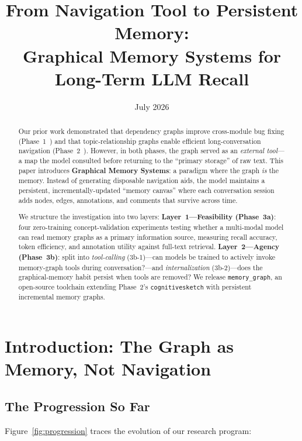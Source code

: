 \documentclass[11pt,a4paper]{article}
\title{\bfseries From Navigation Tool to Persistent Memory:\\[3pt]
       \large Graphical Memory Systems for Long-Term LLM Recall}
\author{}
\date{July 2026}
\begin{document}
\maketitle

\begin{abstract}
Our prior work demonstrated that dependency graphs improve cross-module bug fixing (Phase~1~\cite{depgraph2026}) and that topic-relationship graphs enable efficient long-conversation navigation (Phase~2~\cite{cognitivesketch2026}). However, in both phases, the graph served as an \textit{external tool}---a map the model consulted before returning to the ``primary storage'' of raw text. This paper introduces \textbf{Graphical Memory Systems}: a paradigm where the graph \textit{is} the memory. Instead of generating disposable navigation aids, the model maintains a persistent, incrementally-updated ``memory canvas'' where each conversation session adds nodes, edges, annotations, and comments that survive across time.

We structure the investigation into two layers: \textbf{Layer~1---Feasibility (Phase~3a)}: four zero-training concept-validation experiments testing whether a multi-modal model can read memory graphs as a primary information source, measuring recall accuracy, token efficiency, and annotation utility against full-text retrieval. \textbf{Layer~2---Agency (Phase~3b)}: split into \textit{tool-calling} (3b-1)---can models be trained to actively invoke memory-graph tools during conversation?---and \textit{internalization} (3b-2)---does the graphical-memory habit persist when tools are removed? We release \texttt{memory\_graph}, an open-source toolchain extending Phase~2's \texttt{cognitivesketch} with persistent incremental memory graphs.
\end{abstract}


\section{Introduction: The Graph as Memory, Not Navigation}

\subsection{The Progression So Far}

Figure~\ref{fig:progression} traces the evolution of our research program:
\end{document}
